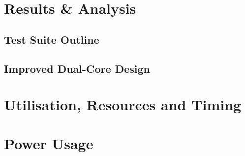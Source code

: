 \section{Results \& Analysis}
\subsection{Test Suite Outline}
\subsection{Improved Dual-Core Design}
\section{Utilisation, Resources and Timing}
\section{Power Usage}